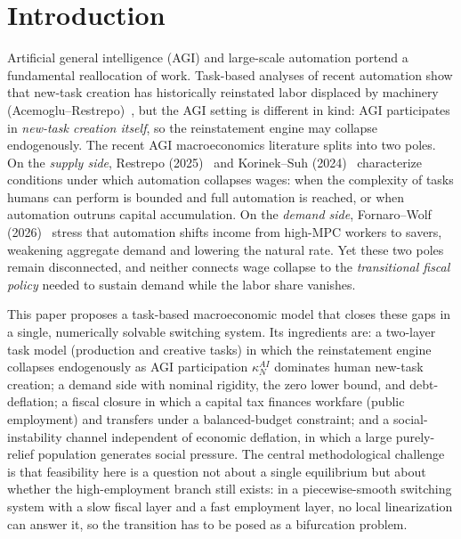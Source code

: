 \documentclass[review,12pt]{elsarticle}
\theoremstyle{plain}
\theoremstyle{definition}
\theoremstyle{remark}
\begin{document}
\section{Introduction}
Artificial general intelligence (AGI) and large-scale automation portend a fundamental reallocation of work. Task-based analyses of recent automation show that new-task creation has historically reinstated labor displaced by machinery (Acemoglu--Restrepo)~\cite{AR2018}, but the AGI setting is different in kind: AGI participates in \emph{new-task creation itself}, so the reinstatement engine may collapse endogenously. The recent AGI macroeconomics literature splits into two poles. On the \emph{supply side}, Restrepo (2025)~\cite{Restrepo2025} and Korinek--Suh (2024)~\cite{KS2024} characterize conditions under which automation collapses wages: when the complexity of tasks humans can perform is bounded and full automation is reached, or when automation outruns capital accumulation. On the \emph{demand side}, Fornaro--Wolf (2026)~\cite{FW2026} stress that automation shifts income from high-MPC workers to savers, weakening aggregate demand and lowering the natural rate. Yet these two poles remain disconnected, and neither connects wage collapse to the \emph{transitional fiscal policy} needed to sustain demand while the labor share vanishes.

This paper proposes a task-based macroeconomic model that closes these gaps in a single, numerically solvable switching system. Its ingredients are: a two-layer task model (production and creative tasks) in which the reinstatement engine collapses endogenously as AGI participation $\kappa_N^{AI}$ dominates human new-task creation; a demand side with nominal rigidity, the zero lower bound, and debt-deflation; a fiscal closure in which a capital tax finances workfare (public employment) and transfers under a balanced-budget constraint; and a social-instability channel independent of economic deflation, in which a large purely-relief population generates social pressure. The central methodological challenge is that feasibility here is a question not about a single equilibrium but about whether the high-employment branch still exists: in a piecewise-smooth switching system with a slow fiscal layer and a fast employment layer, no local linearization can answer it, so the transition has to be posed as a bifurcation problem.
\end{document}
